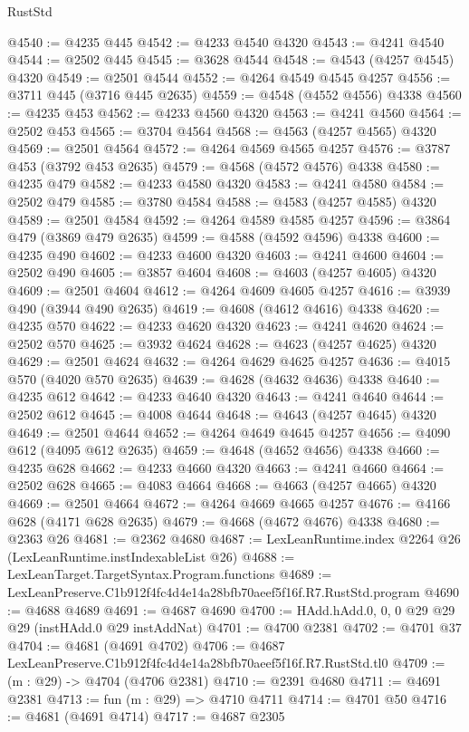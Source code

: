 \begin{lexlean}{RustStd}
\begin{coremodule}
@4540 := @4235 @445
@4542 := @4233 @4540 @4320
@4543 := @4241 @4540
@4544 := @2502 @445
@4545 := @3628 @4544
@4548 := @4543 (@4257 @4545) @4320
@4549 := @2501 @4544
@4552 := @4264 @4549 @4545 @4257
@4556 := @3711 @445 (@3716 @445 @2635)
@4559 := @4548 (@4552 @4556) @4338
@4560 := @4235 @453
@4562 := @4233 @4560 @4320
@4563 := @4241 @4560
@4564 := @2502 @453
@4565 := @3704 @4564
@4568 := @4563 (@4257 @4565) @4320
@4569 := @2501 @4564
@4572 := @4264 @4569 @4565 @4257
@4576 := @3787 @453 (@3792 @453 @2635)
@4579 := @4568 (@4572 @4576) @4338
@4580 := @4235 @479
@4582 := @4233 @4580 @4320
@4583 := @4241 @4580
@4584 := @2502 @479
@4585 := @3780 @4584
@4588 := @4583 (@4257 @4585) @4320
@4589 := @2501 @4584
@4592 := @4264 @4589 @4585 @4257
@4596 := @3864 @479 (@3869 @479 @2635)
@4599 := @4588 (@4592 @4596) @4338
@4600 := @4235 @490
@4602 := @4233 @4600 @4320
@4603 := @4241 @4600
@4604 := @2502 @490
@4605 := @3857 @4604
@4608 := @4603 (@4257 @4605) @4320
@4609 := @2501 @4604
@4612 := @4264 @4609 @4605 @4257
@4616 := @3939 @490 (@3944 @490 @2635)
@4619 := @4608 (@4612 @4616) @4338
@4620 := @4235 @570
@4622 := @4233 @4620 @4320
@4623 := @4241 @4620
@4624 := @2502 @570
@4625 := @3932 @4624
@4628 := @4623 (@4257 @4625) @4320
@4629 := @2501 @4624
@4632 := @4264 @4629 @4625 @4257
@4636 := @4015 @570 (@4020 @570 @2635)
@4639 := @4628 (@4632 @4636) @4338
@4640 := @4235 @612
@4642 := @4233 @4640 @4320
@4643 := @4241 @4640
@4644 := @2502 @612
@4645 := @4008 @4644
@4648 := @4643 (@4257 @4645) @4320
@4649 := @2501 @4644
@4652 := @4264 @4649 @4645 @4257
@4656 := @4090 @612 (@4095 @612 @2635)
@4659 := @4648 (@4652 @4656) @4338
@4660 := @4235 @628
@4662 := @4233 @4660 @4320
@4663 := @4241 @4660
@4664 := @2502 @628
@4665 := @4083 @4664
@4668 := @4663 (@4257 @4665) @4320
@4669 := @2501 @4664
@4672 := @4264 @4669 @4665 @4257
@4676 := @4166 @628 (@4171 @628 @2635)
@4679 := @4668 (@4672 @4676) @4338
@4680 := @2363 @26
@4681 := @2362 @4680
@4687 := LexLeanRuntime.index @2264 @26 (LexLeanRuntime.instIndexableList @26)
@4688 := LexLeanTarget.TargetSyntax.Program.functions
@4689 := LexLeanPreserve.C1b912f4fc4d4e14a28bfb70aeef5f16f.R7.RustStd.program
@4690 := @4688 @4689
@4691 := @4687 @4690
@4700 := HAdd.hAdd.{0, 0, 0} @29 @29 @29 (instHAdd.{0} @29 instAddNat)
@4701 := @4700 @2381
@4702 := @4701 @37
@4704 := @4681 (@4691 @4702)
@4706 := @4687 LexLeanPreserve.C1b912f4fc4d4e14a28bfb70aeef5f16f.R7.RustStd.tl0
@4709 := (m : @29) -> @4704 (@4706 @2381)
@4710 := @2391 @4680
@4711 := @4691 @2381
@4713 := fun (m : @29) => @4710 @4711
@4714 := @4701 @50
@4716 := @4681 (@4691 @4714)
@4717 := @4687 @2305

\end{coremodule}
\end{lexlean}
